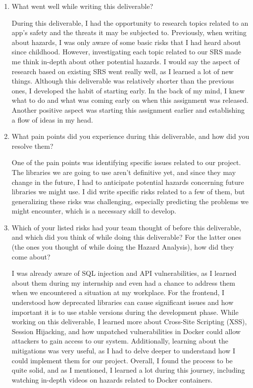 \documentclass{article}
\begin{document}
\begin{enumerate}
    \item What went well while writing this deliverable? 

    During this deliverable, I had the opportunity to research topics related to an app’s safety and the threats it may be subjected to. Previously, when writing about hazards, I was only aware of some basic risks that I had heard about since childhood. However, investigating each topic related to our SRS made me think in-depth about other potential hazards. I would say the aspect of research based on existing SRS went really well, as I learned a lot of new things. Although this deliverable was relatively shorter than the previous ones, I developed the habit of starting early. In the back of my mind, I knew what to do and what was coming early on when this assignment was released. Another positive aspect was starting this assignment earlier and establishing a flow of ideas in my head.

    \item What pain points did you experience during this deliverable, and how did you resolve them? 

    One of the pain points was identifying specific issues related to our project. The libraries we are going to use aren’t definitive yet, and since they may change in the future, I had to anticipate potential hazards concerning future libraries we might use. I did write specific risks related to a few of them, but generalizing these risks was challenging, especially predicting the problems we might encounter, which is a necessary skill to develop.

    \item Which of your listed risks had your team thought of before this deliverable, and which did you think of while doing this deliverable? For the latter ones (the ones you thought of while doing the Hazard Analysis), how did they come about? 

    I was already aware of SQL injection and API vulnerabilities, as I learned about them during my internship and even had a chance to address them when we encountered a situation at my workplace. For the frontend, I understood how deprecated libraries can cause significant issues and how important it is to use stable versions during the development phase. While working on this deliverable, I learned more about Cross-Site Scripting (XSS), Session Hijacking, and how unpatched vulnerabilities in Docker could allow attackers to gain access to our system. Additionally, learning about the mitigations was very useful, as I had to delve deeper to understand how I could implement them for our project. Overall, I found the process to be quite solid, and as I mentioned, I learned a lot during this journey, including watching in-depth videos on hazards related to Docker containers.


\end{enumerate}
\end{document}
